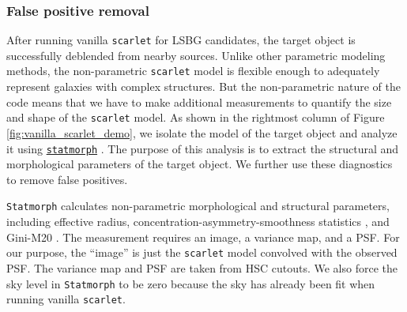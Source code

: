 \documentclass[twocolumn,astrosymb,twocolappendix]{aastex631}
\newcommand{\code}[1]{\texttt{#1}}
\begin{document}
\begin{CJK*}{UTF8}{gbsn}
\subsubsection{False positive removal}\label{sec:non-par-measurement}

After running vanilla \code{scarlet} for LSBG candidates, the target object is successfully deblended from nearby sources. Unlike other parametric modeling methods, the non-parametric \code{scarlet} model is flexible enough to adequately represent galaxies with complex structures. But the non-parametric nature of the code means that we have to make additional measurements to quantify the size and shape of the \code{scarlet} model. As shown in the rightmost column of Figure \ref{fig:vanilla_scarlet_demo}, we isolate the model of the target object and analyze it using \href{https://statmorph.readthedocs.io/en/latest/}{\code{statmorph}} \citep{statmorph}. The purpose of this analysis is to extract the structural and morphological parameters of the target object. We further use these diagnostics to remove false positives. 

\code{Statmorph} calculates non-parametric morphological and structural parameters, including effective radius, concentration-asymmetry-smoothness statistics \citep[CAS,][]{Conselice2003}, and Gini-M20 \citep{Abraham2003,Lotz2004}. The measurement requires an image, a variance map, and a PSF. For our purpose, the ``image'' is just the \code{scarlet} model convolved with the observed PSF. The variance map and PSF are taken from HSC cutouts. We also force the sky level in \code{Statmorph} to be zero because the sky has already been fit when running vanilla \code{scarlet}. 


\end{CJK*}
\end{document}
